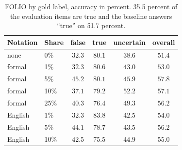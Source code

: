 \begin{table}[H]
\caption{FOLIO by gold label, accuracy in percent. 35.5 percent of the evaluation items are true and the baseline answers ``true'' on 51.7 percent.}
\label{tab:folio}
\begin{center}
\begin{tabular}{llcccc}
\toprule
Notation & Share & false & true & uncertain & overall \\
\midrule
none    & 0\%  & $32.3$ & $80.1$ & $38.6$ & $51.4$ \\
formal  & 1\%  & $32.3$ & $80.6$ & $43.0$ & $53.0$ \\
formal  & 5\%  & $\mathbf{45.2}$ & $80.1$ & $45.9$ & $\mathbf{57.8}$ \\
formal  & 10\% & $37.1$ & $79.2$ & $\mathbf{52.2}$ & $57.1$ \\
formal  & 25\% & $40.3$ & $76.4$ & $49.3$ & $56.2$ \\
English & 1\%  & $32.3$ & $83.8$ & $42.5$ & $54.0$ \\
English & 5\%  & $44.1$ & $78.7$ & $43.5$ & $56.2$ \\
English & 10\% & $42.5$ & $75.5$ & $44.9$ & $55.0$ \\
\bottomrule
\end{tabular}
\end{center}
\end{table}
